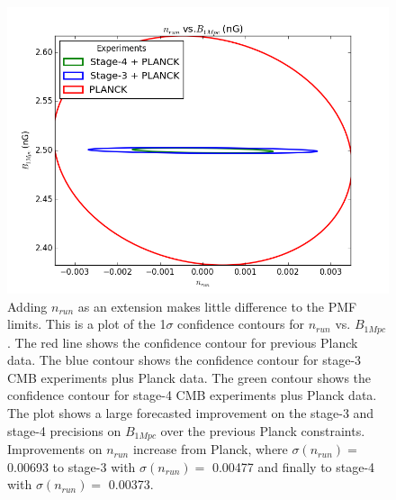 {{\begin{figure}[h]
\centering
\includegraphics[scale=0.85]{images/contours/nrun.png}
\caption{Adding $n_{run}$ as an extension makes little difference to the PMF limits. This is a plot of the 1$\sigma$ confidence contours for $n_{run}$ vs. $B_{1Mpc}$. The red line shows the confidence contour for previous Planck data. The blue contour shows the confidence contour for stage-3 CMB experiments plus Planck data. The green contour shows the confidence contour for stage-4 CMB experiments plus Planck data. The plot shows a large forecasted improvement on the stage-3 and stage-4 precisions on $B_{1Mpc}$ over the previous Planck constraints. Improvements on $n_{run}$ increase from Planck, where $\sigma(n_{run}) =$ 0.00693 to stage-3 with $\sigma(n_{run}) =$ 0.00477 and finally to stage-4 with $\sigma(n_{run}) =$ 0.00373.}
\label{fig:nrun}
\end{figure}

}}
